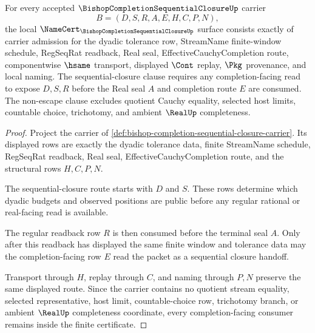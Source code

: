 \begin{theorem}
\label{thm:bishop-completion-sequential-closure-obligations}
For every accepted $\BishopCompletionSequentialClosureUp$ carrier
$$
B=(D,S,R,A,E,H,C,P,N),
$$
the local $\NameCert_{\BishopCompletionSequentialClosureUp}$ surface consists exactly of carrier admission for the dyadic tolerance row, StreamName finite-window schedule, RegSeqRat readback, Real seal, EffectiveCauchyCompletion route, componentwise $\hsame$ transport, displayed $\Cont$ replay, $\Pkg$ provenance, and local naming. The sequential-closure clause requires any completion-facing read to expose $D,S,R$ before the Real seal $A$ and completion route $E$ are consumed. The non-escape clause excludes quotient Cauchy equality, selected host limits, countable choice, trichotomy, and ambient $\RealUp$ completeness.
\end{theorem}
\begin{proof}
Project the carrier of \autoref{def:bishop-completion-sequential-closure-carrier}. Its displayed rows are exactly the dyadic tolerance data, finite StreamName schedule, RegSeqRat readback, Real seal, EffectiveCauchyCompletion route, and the structural rows $H,C,P,N$.

The sequential-closure route starts with $D$ and $S$. These rows determine which dyadic budgets and observed positions are public before any regular rational or real-facing read is available.

The regular readback row $R$ is then consumed before the terminal seal $A$. Only after this readback has displayed the same finite window and tolerance data may the completion-facing row $E$ read the packet as a sequential closure handoff.

Transport through $H$, replay through $C$, and naming through $P,N$ preserve the same displayed route. Since the carrier contains no quotient stream equality, selected representative, host limit, countable-choice row, trichotomy branch, or ambient $\RealUp$ completeness coordinate, every completion-facing consumer remains inside the finite certificate.
\end{proof}


